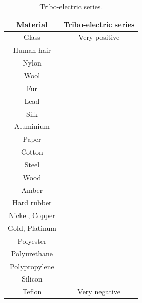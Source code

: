 \begin{minipage}{.6\textwidth}
\begin{center}
\begin{table}[H]
\centering
\begin{tabular}{|cc|}\hline
\textbf{Material}&\textbf{Tribo-electric series}\\\hline
Glass& Very positive\\\hline
Human hair&\\\hline
Nylon&\\\hline
Wool&\\\hline
Fur&\\\hline
Lead&\\\hline
Silk&\\\hline
Aluminium&\\\hline
Paper&\\\hline
Cotton&\\\hline
Steel &\\\hline
Wood&\\\hline
Amber&\\\hline
Hard rubber&\\\hline
Nickel, Copper&\\\hline
Gold, Platinum&\\\hline
Polyester&\\\hline
Polyurethane&\\\hline
Polypropylene&\\\hline
Silicon&\\\hline
Teflon& Very negative\\\hline
\end{tabular}
\caption{Tribo-electric series.}
\end{table}
\end{center}
\end{minipage}


    \label{m38780*cid6}
